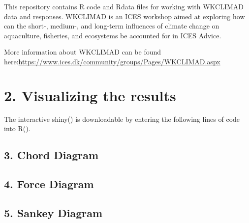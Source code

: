 \documentclass[
]{article}
\begin{document}
This repository contains R code and Rdata files for working with
WKCLIMAD data and responses. WKCLIMAD is an ICES workshop aimed at
exploring how can the short-, medium-, and long-term influences of
climate change on aquaculture, fisheries, and ecosystems be accounted
for in ICES Advice.

More information about WKCLIMAD can be found
here:\url{https://www.ices.dk/community/groups/Pages/WKCLIMAD.aspx}

\hypertarget{visualizing-the-results}{%
\section{2. Visualizing the results}\label{visualizing-the-results}}

The interactive shiny() is downloadable by entering the following lines
of code into R().

\hypertarget{chord-diagram}{%
\subsection{3. Chord Diagram}\label{chord-diagram}}

\hypertarget{force-diagram}{%
\subsection{4. Force Diagram}\label{force-diagram}}

\hypertarget{sankey-diagram}{%
\subsection{5. Sankey Diagram}\label{sankey-diagram}}
\end{document}
